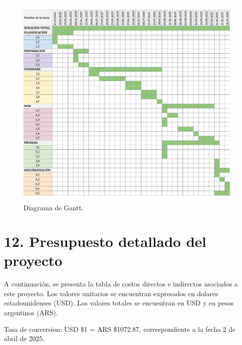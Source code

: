 \documentclass[
11pt, %
]{charter}
\begin{document}
\begin{figure}[htpb]
\centering 
\includegraphics[height=.62\textheight]{./Figuras/Gantt.pdf}
\caption{Diagrama de Gantt.}
\label{fig:diagGantt}
\end{figure}


\section{12. Presupuesto detallado del proyecto}
\label{sec:presupuesto}

A continuación, se presenta la tabla de costos directos e indirectos asociados a este proyecto. Los valores unitarios se encuentran expresados en dolares estadounidenses (USD). Los valores totales se encuentran en USD y en pesos argentinos (ARS). 

Tasa de conversion: USD \$1 = ARS \$1072.87, correspondiente a la fecha 2 de abril de 2025.
\end{document}
